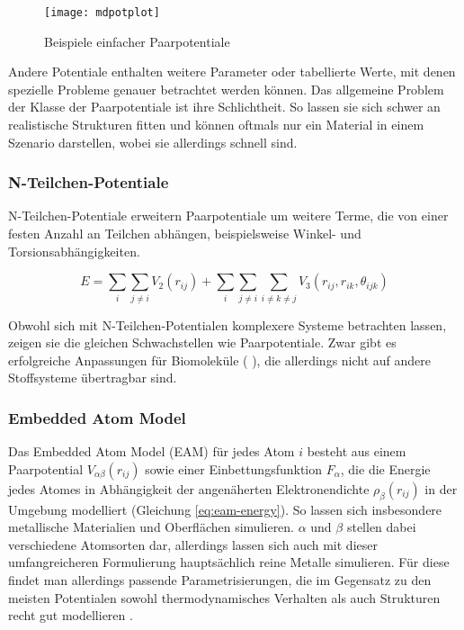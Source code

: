 \begin{figure}
  \centering
  \texttt{[image: mdpotplot]}
  \caption{Beispiele einfacher Paarpotentiale}
  \label{fig:mdpairpotentials}
\end{figure}

Andere Potentiale enthalten weitere Parameter oder tabellierte Werte, mit denen spezielle Probleme genauer betrachtet werden können.
Das allgemeine Problem der Klasse der Paarpotentiale ist ihre Schlichtheit.
So lassen sie sich schwer an realistische Strukturen fitten und können oftmals nur ein Material in einem Szenario darstellen, wobei sie allerdings schnell sind.

\subsubsection{N-Teilchen-Potentiale}

N-Teilchen-Potentiale  erweitern Paarpotentiale um weitere Terme, die von einer festen Anzahl an Teilchen abhängen, beispielsweise Winkel- und Torsionsabhängigkeiten.

\begin{equation}
  \label{eq:nbody-energy}
  E = \sum_i\sum_{j \neq i}{V_2\left(r_{ij}\right)} + \sum_i\sum_{j \neq i}\sum_{i \neq k \neq j}{V_3\left(r_{ij}, r_{ik}, \theta_{ijk}\right)}
\end{equation}

Obwohl sich mit N-Teilchen-Potentialen komplexere Systeme betrachten lassen, zeigen sie die gleichen Schwachstellen wie Paarpotentiale.
Zwar gibt es erfolgreiche  Anpassungen für Biomoleküle (  ), die allerdings nicht auf andere Stoffsysteme übertragbar sind.

\subsubsection{Embedded Atom Model}

Das Embedded Atom Model (EAM) für jedes Atom $i$ besteht aus einem Paarpotential $V_{\alpha\beta}(r_{ij})$ sowie einer Einbettungsfunktion $F_\alpha$, die die Energie jedes Atomes in Abhängigkeit der angenäherten Elektronendichte $\rho_\beta(r_{ij})$ in der Umgebung modelliert (Gleichung \ref{eq:eam-energy}).
So lassen sich insbesondere metallische Materialien und Oberflächen simulieren.
$\alpha$ und $\beta$ stellen dabei verschiedene Atomsorten dar, allerdings lassen sich auch mit dieser umfangreicheren Formulierung hauptsächlich reine Metalle simulieren.
Für diese findet man allerdings passende Parametrisierungen, die im Gegensatz zu den meisten Potentialen sowohl thermodynamisches Verhalten als auch Strukturen recht gut modellieren .

